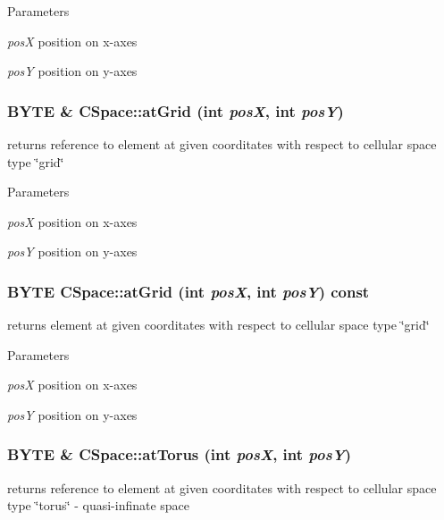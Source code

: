 \begin{DoxyParams}{Parameters}
\item[{\em posX}]position on x-\/axes \item[{\em posY}]position on y-\/axes \end{DoxyParams}
\hypertarget{classCSpace_a2ad446a5bb454b65212430b71980a70e}{
\subsubsection[{atGrid}]{\setlength{\rightskip}{0pt plus 5cm}BYTE \& CSpace::atGrid (int {\em posX}, \/  int {\em posY})}}
\label{classCSpace_a2ad446a5bb454b65212430b71980a70e}
returns reference to element at given coorditates with respect to cellular space type \char`\"{}grid\char`\"{}


\begin{DoxyParams}{Parameters}
\item[{\em posX}]position on x-\/axes \item[{\em posY}]position on y-\/axes \end{DoxyParams}
\hypertarget{classCSpace_a83689b4589c9f5c8d41931e830d302a1}{
\subsubsection[{atGrid}]{\setlength{\rightskip}{0pt plus 5cm}BYTE CSpace::atGrid (int {\em posX}, \/  int {\em posY}) const}}
\label{classCSpace_a83689b4589c9f5c8d41931e830d302a1}
returns element at given coorditates with respect to cellular space type \char`\"{}grid\char`\"{}


\begin{DoxyParams}{Parameters}
\item[{\em posX}]position on x-\/axes \item[{\em posY}]position on y-\/axes \end{DoxyParams}
\hypertarget{classCSpace_a1e2364f59e8dcacd46a5f96d878ca349}{
\subsubsection[{atTorus}]{\setlength{\rightskip}{0pt plus 5cm}BYTE \& CSpace::atTorus (int {\em posX}, \/  int {\em posY})}}
\label{classCSpace_a1e2364f59e8dcacd46a5f96d878ca349}
returns reference to element at given coorditates with respect to cellular space type \char`\"{}torus\char`\"{} -\/ quasi-\/infinate space



